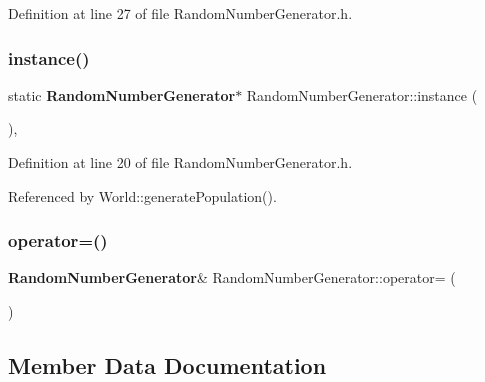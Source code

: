 Definition at line 27 of file Random\+Number\+Generator.\+h.

\mbox{\label{class_random_number_generator_ab20e4f6dae4e1d216357d26675488e45}} 
\subsubsection{instance()}
{\footnotesize\ttfamily static \textbf{ Random\+Number\+Generator}$\ast$ Random\+Number\+Generator\+::instance (\begin{DoxyParamCaption}{ }\end{DoxyParamCaption})\hspace{0.3cm}{\ttfamily [inline]}, {\ttfamily [static]}}



Definition at line 20 of file Random\+Number\+Generator.\+h.



Referenced by World\+::generate\+Population().

\mbox{\label{class_random_number_generator_a5986c38214e8c774239eee89c768f172}} 
\subsubsection{operator=()}
{\footnotesize\ttfamily \textbf{ Random\+Number\+Generator}\& Random\+Number\+Generator\+::operator= (\begin{DoxyParamCaption}\item[{const \textbf{ Random\+Number\+Generator} \&}]{ }\end{DoxyParamCaption})\hspace{0.3cm}{\ttfamily [private]}}



\subsection{Member Data Documentation}
\mbox{\label{class_random_number_generator_a0669afa8b2ad0fd544f140e294ce581f}} 
